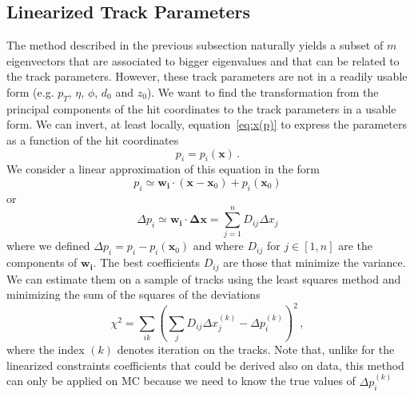 \documentclass[10pt,a4paper]{article}
\newcommand{\bfx}{\mathbf{x}}
\begin{document}
\subsection{Linearized Track Parameters}

The method described in the previous subsection naturally yields a subset of $m$ eigenvectors that are associated to bigger eigenvalues and that can be related to the track parameters. However, these track parameters are not in a readily usable form (e.g. $p_T$, $\eta$, $\phi$, $d_0$ and $z_0$). We want to find the transformation from the principal components of the hit coordinates to the track parameters in a usable form. We can invert, at least locally, equation~\ref{eq:x(p)} to express the  parameters as a function of the hit coordinates
\begin{equation}
p_i = p_i(\bfx) \, .
\end{equation}
We consider a linear approximation of this equation in the form
\begin{equation}
p_i \simeq \mathbf{w_i}\cdot(\bfx - \bfx_0) + p_i(\bfx_0)
\end{equation}
or
\begin{equation}
\Delta p_i \simeq \mathbf{w_i} \cdot \mathbf{\Delta} \bfx = \sum\limits_{j=1}^n D_{ij} \Delta x_j
\end{equation}
where we defined $\Delta p_i = p_i - p_i(\bfx_0)$ and where $D_{ij}$ for $j\in [1,n]$ are the components of $\mathbf{w_i}$.
The best coefficients $D_{ij}$ are those that minimize the variance. We can estimate them on a sample of tracks using the least squares method and minimizing the sum of the squares of the deviations
\begin{equation}
\chi^2 = \sum\limits_{ik}\left(\sum\limits_j D_{ij} \Delta x_j^{(k)} - \Delta p_i^{(k)} \right)^2 \, ,
\label{eq:chi2}
\end{equation}
where the index $(k)$ denotes iteration on the tracks. Note that, unlike for the linearized constraints coefficients that could be derived also on data, this method can only be applied on MC because we need to know the true values of $\Delta p_i^{(k)}$
\end{document}
